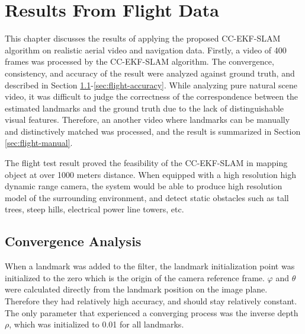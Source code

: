 \chapter{Results From Flight Data}\label{ch:FlightResult}

This chapter discusses the results of applying the proposed
CC-EKF-SLAM algorithm on realistic aerial video and navigation data.
Firstly, a video of 400 frames was processed by the CC-EKF-SLAM
algorithm. The convergence, consistency, and accuracy of the result
were analyzed against ground truth, and described in Section
\ref{sec:flight-converge}-\ref{sec:flight-accuracy}. While analyzing
pure natural scene video, it was difficult to judge the correctness of
the correspondence between the estimated landmarks and the ground
truth due to the lack of distinguishable visual features. Therefore,
an another video where landmarks can be manually and distinctively
matched was processed, and the result is summarized in Section
\ref{sec:flight-manual}.

The flight test result proved the feasibility of the CC-EKF-SLAM in
mapping object at over 1000 meters distance. When equipped with a high
resolution high dynamic range camera, the system would be able to
produce high resolution model of the surrounding environment, and
detect static obstacles such as tall trees, steep hills, electrical
power line towers, etc.

\section{Convergence Analysis}\label{sec:flight-converge}
When a landmark was added to the filter, the landmark initialization
point was initialized to the zero which is the origin of the camera
reference frame. $\varphi$ and $\theta$ were calculated directly from
the landmark position on the image plane. Therefore they had relatively
high accuracy, and should stay relatively constant. The only parameter
that experienced a converging process was the inverse depth $\rho$,
which was initialized to 0.01 for all landmarks.

